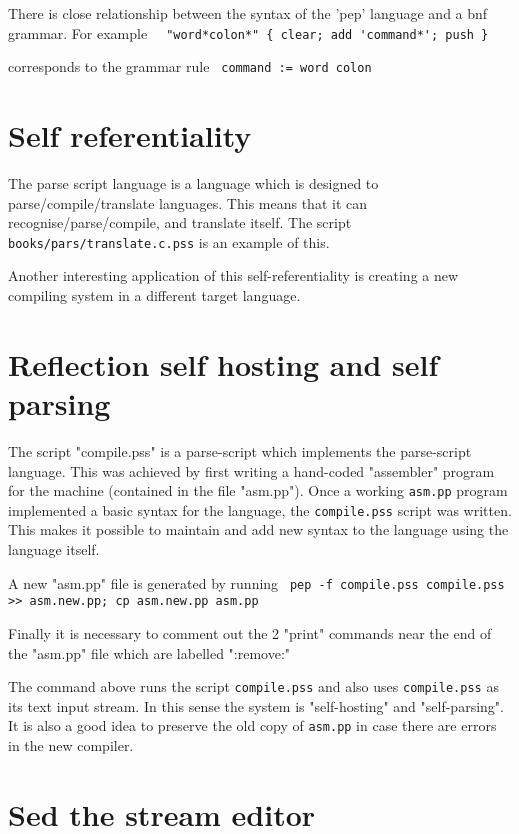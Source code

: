 \documentclass[a4paper,12pt]{article}
\begin{document}
  There is close relationship between the syntax of the 'pep' language
  and a bnf grammar. For example 
 \verb|  "word*colon*" { clear; add 'command*'; push } |


  corresponds to the grammar rule 
 \verb| command := word colon |


\section{Self referentiality}

  The parse script language is a language which is designed to
  parse/compile/translate languages. This means that it can
  recognise/parse/compile, and translate itself. The script
  \texttt{books/pars/translate.c.pss} is an example of this.

  Another interesting application of this self-referentiality
  is creating a new compiling system in a different target language.
    
\section{Reflection self hosting and self parsing}

  The script "compile.pss" is a parse-script which implements the
  parse-script language. This was achieved by first writing a hand-coded
  "assembler" program for the machine (contained in the file "asm.pp").
  Once a working \texttt{asm.pp} program implemented a basic syntax for the language,
  the \texttt{compile.pss} script was written. This makes it possible to maintain and
  add new syntax to the language using the language itself.

  A new "asm.pp" file is generated by running 
 \verb| pep -f compile.pss compile.pss >> asm.new.pp; cp asm.new.pp asm.pp |


  Finally it is necessary to comment out the 2 "print" commands near
  the end of the "asm.pp" file which are labelled ":remove:"

  The command above runs the script \texttt{compile.pss} and also uses \texttt{compile.pss} as
  its text input stream. In this sense the system is "self-hosting" and
  "self-parsing". It is also a good idea to preserve the old copy of \texttt{asm.pp}
  in case there are errors in the new compiler.

\section{Sed the stream editor}
\end{document}
